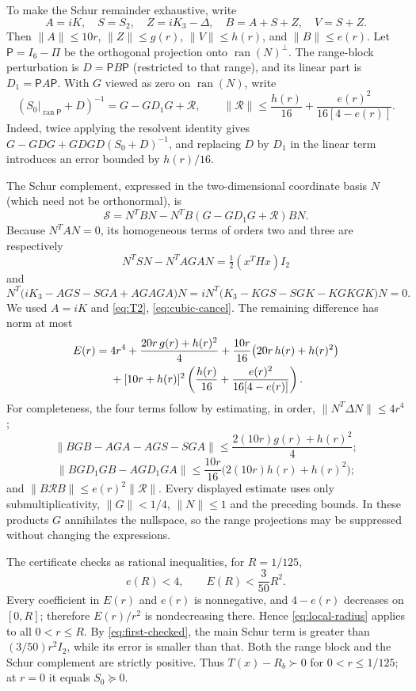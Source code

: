 \documentclass[11pt]{article}
\newcommand{\ran}{\operatorname{ran}}
\begin{document}
To make the Schur remainder exhaustive, write
\[
 A=iK,\quad S=S_2,\quad Z=iK_3-\Delta,\quad
 B=A+S+Z,\quad V=S+Z.
\]
Then $\|A\|\le10r$, $\|Z\|\le g(r)$,
$\|V\|\le h(r)$, and $\|B\|\le e(r)$.
Let $\mathsf P=I_6-\Pi$ be the orthogonal projection onto
$\operatorname{ran}(N)^\perp$. The range-block perturbation is
$D=\mathsf P B\mathsf P$ (restricted to that range), and its
linear part is $D_1=\mathsf P A\mathsf P$. With $G$ viewed as zero
on $\operatorname{ran}(N)$, write
\[
 (S_0|_{\ran\mathsf P}+D)^{-1}
   =G-GD_1G+\mathcal R,
 \qquad
 \|\mathcal R\|\le\frac{h(r)}{16}
        +\frac{e(r)^2}{16[4-e(r)]}.
\]
Indeed, twice applying the resolvent identity gives
$G-GDG+GDGD(S_0+D)^{-1}$, and replacing $D$ by $D_1$
in the linear term introduces an error bounded by $h(r)/16$.

The Schur complement, expressed in the two-dimensional coordinate
basis $N$ (which need not be orthonormal), is
\[
 \mathcal S=N^TBN-N^TB
 (G-GD_1G+\mathcal R)BN.
\]
Because $N^TAN=0$, its homogeneous terms of orders two and three are
respectively
\[
 N^TSN-N^TAGAN=\tfrac12(x^THx)I_2
\]
and
\[
 N^T\bigl(iK_3-AGS-SGA+AGAGA\bigr)N
 =iN^T\bigl(K_3-KGS-SGK-KGKGK\bigr)N=0.
\]
We used $A=iK$ and \eqref{eq:T2}, \eqref{eq:cubic-cancel}.
The remaining difference has norm at most
\begin{align}\label{eq:error-E}
 E(r)={}&4r^4+\frac{20r\,g(r)+h(r)^2}{4}
 +\frac{10r}{16}\bigl(20r\,h(r)+h(r)^2\bigr)\\
 &+[10r+h(r)]^2
 \left(\frac{h(r)}{16}+\frac{e(r)^2}{16[4-e(r)]}\right).\notag
\end{align}
For completeness, the four terms follow by estimating, in order,
$\|N^T\Delta N\|\le4r^4$;
\[
 \|BGB-AGA-AGS-SGA\|
 \le\frac{2(10r)g(r)+h(r)^2}{4};
\]
\[
 \|BGD_1GB-AGD_1GA\|
 \le\frac{10r}{16}\bigl(2(10r)h(r)+h(r)^2\bigr);
\]
and $\|B\mathcal RB\|\le e(r)^2\|\mathcal R\|$.
Every displayed estimate uses only submultiplicativity,
$\|G\|<1/4$, $\|N\|\le1$ and the preceding bounds.
In these products $G$ annihilates the nullspace, so the range
projections may be suppressed without changing the expressions.

The certificate checks as rational inequalities, for $R=1/125$,
\begin{equation}\label{eq:local-radius}
 e(R)<4,\qquad E(R)<\frac3{50}R^2.
\end{equation}
Every coefficient in $E(r)$ and $e(r)$ is nonnegative, and $4-e(r)$ decreases on $[0,R]$; therefore $E(r)/r^2$ is nondecreasing there. Hence \eqref{eq:local-radius} applies to all $0<r\le R$. By \eqref{eq:first-checked}, the main Schur term is greater than $(3/50)r^2I_2$, while its error is smaller than that. Both the range block and the Schur complement are strictly positive. Thus $T(x)-R_b\succ0$ for $0<r\le1/125$; at $r=0$ it equals $S_0\succeq0$.
\end{document}
